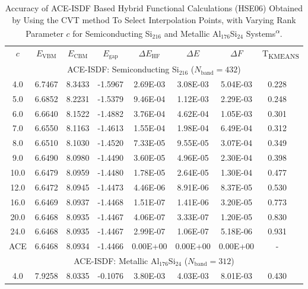 \begin{table}[htbp]
	\centering
	\caption{Accuracy of ACE-ISDF Based Hybrid Functional Calculations 
	(HSE06) Obtained by Using the CVT method To Select Interpolation Points,
	with Varying Rank Parameter $c$ for Semiconducting Si$_{216}$ and Metallic
	Al$_{176}$Si$_{24}$ Systems\textsuperscript{$\alpha$}.}\label{tab:Accuracy}
	\begin{threeparttable}
		\begin{tabular}{cccccccc}
			\rowcolor{lightgray}$c$  &  $E_\text{VBM}$ & $E_\text{CBM}$ & $E_\text{gap}$
			& ${\Delta}E_\text{HF}$ & ${\Delta}E$ & ${\Delta}F$ & T\textsubscript{KMEANS} \\
			\multicolumn{8}{c}{\multirow{2}{*}{ACE-ISDF: Semiconducting Si$_{216}$ ($N_\text{band}=432$)}} \\ \\
			 4.0 & 6.7467 & 8.3433 & -1.5967 &  2.69E-03 &  3.08E-03 &  5.04E-03 &  0.228 \ \\
			 5.0 & 6.6852 & 8.2231 & -1.5379 &  9.46E-04 &  1.12E-03 &  2.29E-03 &  0.248 \ \\
			 6.0 & 6.6640 & 8.1522 & -1.4882 &  3.76E-04 &  4.62E-04 &  1.05E-03 &  0.301 \ \\
			 7.0 & 6.6550 & 8.1163 & -1.4613 &  1.55E-04 &  1.98E-04 &  6.49E-04 &  0.312 \ \\
			 8.0 & 6.6510 & 8.1030 & -1.4520 &  7.33E-05 &  9.55E-05 &  3.07E-04 &  0.349 \ \\
			 9.0 & 6.6490 & 8.0980 & -1.4490 &  3.60E-05 &  4.96E-05 &  2.30E-04 &  0.398 \ \\
			10.0 & 6.6479 & 8.0959 & -1.4480 &  1.78E-05 &  2.64E-05 &  1.30E-04 &  0.477 \ \\
			12.0 & 6.6472 & 8.0945 & -1.4473 &  4.46E-06 &  8.91E-06 &  8.37E-05 &  0.530 \ \\
			16.0 & 6.6469 & 8.0937 & -1.4468 &  1.51E-07 &  1.41E-06 &  3.20E-05 &  0.773 \ \\
			20.0 & 6.6468 & 8.0935 & -1.4467 &  4.06E-07 &  3.33E-07 &  1.20E-05 &  0.830 \ \\
			24.0 & 6.6468 & 8.0935 & -1.4467 &  2.99E-07 &  1.06E-07 &  5.18E-06 &  0.931 \ \\
			 ACE & 6.6468 & 8.0934 & -1.4466 &  0.00E+00 &  0.00E+00 &  0.00E+00 &  - \ \\
			\multicolumn{8}{c}{\multirow{2}{*}{ACE-ISDF: Metallic Al$_{176}$Si$_{24}$ ($N_\text{band} =312$)}} \\ \\
			 4.0 & 7.9258 & 8.0335 & -0.1076 &  3.80E-03 &  4.03E-03 &  8.01E-03 &  0.430 \ \\

\end{tabular}
\end{threeparttable}
\end{table}

